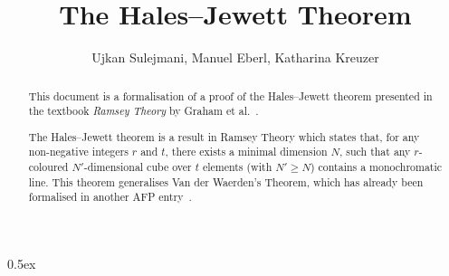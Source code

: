 \documentclass[11pt,a4paper]{article}
\begin{document}
\title{The Hales--Jewett Theorem}
\author{Ujkan Sulejmani, Manuel Eberl, Katharina Kreuzer}
\maketitle

\begin{abstract}
    This document is a formalisation of a proof of the Hales--Jewett theorem presented in the textbook \emph{Ramsey Theory} by Graham et al.~\cite{thebook}.
    
    The Hales--Jewett theorem is a result in Ramsey Theory which states that, for any non-negative integers $r$ and $t$, there exists a minimal dimension $N$, such that any $r$-coloured $N'$-dimensional cube over $t$ elements (with $N' \geq N$) contains a monochromatic line. This theorem generalises Van der Waerden's Theorem, which has already been formalised in another AFP entry~\cite{vdw}.
\end{abstract}


\newpage
\tableofcontents

\newpage
\parindent 0pt\parskip 0.5ex



\nocite{vdw}


\end{document}
